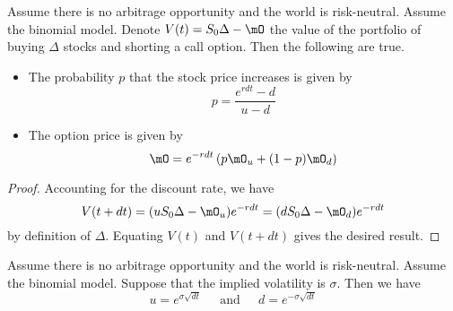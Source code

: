 \documentclass[a4paper]{article}
\begin{document}
\begin{prp}{}{} Assume there is no arbitrage opportunity and the world is risk-neutral. Assume the binomial model. Denote $V(t)=S_0\Delta-\mO$ the value of the portfolio of buying $\Delta$ stocks and shorting a call option. Then the following are true. 
\begin{itemize}
\item The probability $p$ that the stock price increases is given by $$p=\frac{e^{rdt}-d}{u-d}$$
\item The option price is given by $$\mO=e^{-rdt}\left(p\mO_u+(1-p)\mO_d\right)$$
\end{itemize} \tcbline
\begin{proof}
Accounting for the discount rate, we have $$V(t+dt)=(uS_0\Delta-\mO_u)e^{-rdt}=(dS_0\Delta-\mO_d)e^{-rdt}$$ by definition of $\Delta$. Equating $V(t)$ and $V(t+dt)$ gives the desired result. 
\end{proof}
\end{prp}

\begin{lmm}{}{} Assume there is no arbitrage opportunity and the world is risk-neutral. Assume the binomial model. Suppose that the implied volatility is $\sigma$. Then we have $$u=e^{\sigma\sqrt{dt}}\;\;\;\;\text{ and }\;\;\;\;d=e^{-\sigma\sqrt{dt}}$$
\end{lmm}
\end{document}
